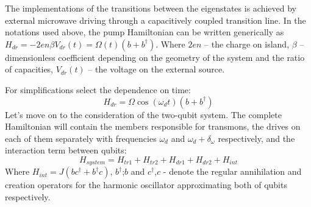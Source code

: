 \documentclass[%
 aip,
 amsmath,amssymb,
 reprint,%
]{revtex4-1}
\begin{document}
The implementations of the transitions between the eigenstates is achieved by external microwave driving through a capacitively coupled transition line. In the notations used above, the pump Hamiltonian can be written generically as $ 	H_{dr} = -2e n\beta V_{dr}(t)=\Omega(t)(b+b^{\dagger})$.
Where $2en$ -- the charge on island, $\beta$ -- dimensionless coefficient depending on the geometry of the system and the ratio of capacities, $V_{dr}(t)$ -- the voltage on the external source.

For simplifications select the dependence on time:
\begin{equation}
H_{dr} = \Omega\cos(\omega_d t)(b+b^{\dagger})
\end{equation}
Let's move on to the consideration of the two-qubit system. The complete Hamiltonian will contain the members responsible for transmons, the drives on each of them separately with frequencies $\omega_d$ and $\omega_d+\delta_{\omega}$ respectively, and the interaction term between qubits:
\begin{equation}\label{Hsystem}
H_{system}= H_{tr1}+H_{tr2}+H_{dr1}+H_{dr2}+H_{int}
\end{equation}
Where $H_{int}= J(bc^{\dagger}+b^{\dagger}c)$, $b^{\dagger}$;$b$ and $c^{\dagger}$,$c$ - denote the regular annihilation and creation operators
for the harmonic oscillator approximating both of qubits respectively.
\end{document}
